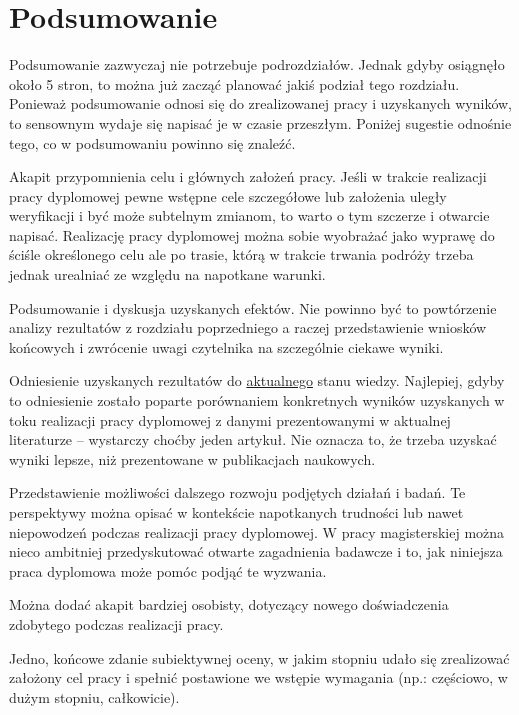 \chapter{Podsumowanie}
\label{ch:podsumowanie}

Podsumowanie zazwyczaj nie potrzebuje podrozdziałów. Jednak gdyby osiągnęło około 5 stron, to można już zacząć planować jakiś podział tego rozdziału. Ponieważ podsumowanie odnosi się do zrealizowanej pracy i uzyskanych wyników, to sensownym wydaje się napisać je w czasie przeszłym. Poniżej sugestie odnośnie tego, co w podsumowaniu powinno się znaleźć.

Akapit przypomnienia celu i głównych założeń pracy. Jeśli w trakcie realizacji pracy dyplomowej pewne wstępne cele szczegółowe lub założenia uległy weryfikacji i być może subtelnym zmianom, to warto o tym szczerze i otwarcie napisać. Realizację pracy dyplomowej można sobie wyobrażać jako wyprawę do ściśle określonego celu ale po trasie, którą w trakcie trwania podróży trzeba jednak urealniać ze względu na napotkane warunki.

Podsumowanie i dyskusja uzyskanych efektów. Nie powinno być to powtórzenie analizy rezultatów z rozdziału poprzedniego a raczej przedstawienie wniosków końcowych i zwrócenie uwagi czytelnika na szczególnie ciekawe wyniki.

Odniesienie uzyskanych rezultatów do \underline{aktualnego} stanu wiedzy. Najlepiej, gdyby to odniesienie zostało poparte porównaniem konkretnych wyników uzyskanych w toku realizacji pracy dyplomowej z danymi prezentowanymi w aktualnej literaturze -- wystarczy choćby jeden artykuł. Nie oznacza to, że trzeba uzyskać wyniki lepsze, niż prezentowane w publikacjach naukowych.

Przedstawienie możliwości dalszego rozwoju podjętych działań i badań. Te perspektywy można opisać w kontekście napotkanych trudności lub nawet niepowodzeń podczas realizacji pracy dyplomowej. W pracy magisterskiej można nieco ambitniej przedyskutować otwarte zagadnienia badawcze i to, jak niniejsza praca dyplomowa może pomóc podjąć te wyzwania.

Można dodać akapit bardziej osobisty, dotyczący nowego doświadczenia zdobytego podczas realizacji pracy.

Jedno, końcowe zdanie subiektywnej oceny, w jakim stopniu udało się zrealizować założony cel pracy i spełnić postawione we wstępie wymagania (np.: częściowo, w dużym stopniu, całkowicie).